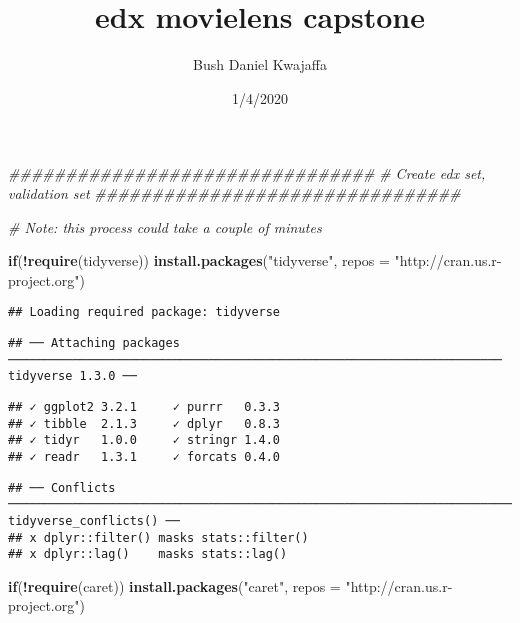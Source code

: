 \documentclass[]{article}
\title{edx movielens capstone}
\author{Bush Daniel Kwajaffa}
\date{1/4/2020}
\newenvironment{Shaded}{\begin{snugshade}}{\end{snugshade}}
\newcommand{\CommentTok}[1]{\textcolor[rgb]{0.56,0.35,0.01}{\textit{#1}}}
\newcommand{\ControlFlowTok}[1]{\textcolor[rgb]{0.13,0.29,0.53}{\textbf{#1}}}
\newcommand{\DataTypeTok}[1]{\textcolor[rgb]{0.13,0.29,0.53}{#1}}
\newcommand{\KeywordTok}[1]{\textcolor[rgb]{0.13,0.29,0.53}{\textbf{#1}}}
\newcommand{\NormalTok}[1]{#1}
\newcommand{\OperatorTok}[1]{\textcolor[rgb]{0.81,0.36,0.00}{\textbf{#1}}}
\newcommand{\StringTok}[1]{\textcolor[rgb]{0.31,0.60,0.02}{#1}}
\begin{document}
\maketitle

\begin{Shaded}
\begin{Highlighting}[]
\CommentTok{################################}
\CommentTok{# Create edx set, validation set}
\CommentTok{################################}

\CommentTok{# Note: this process could take a couple of minutes}

\ControlFlowTok{if}\NormalTok{(}\OperatorTok{!}\KeywordTok{require}\NormalTok{(tidyverse)) }\KeywordTok{install.packages}\NormalTok{(}\StringTok{"tidyverse"}\NormalTok{, }\DataTypeTok{repos =} \StringTok{"http://cran.us.r-project.org"}\NormalTok{)}
\end{Highlighting}
\end{Shaded}

\begin{verbatim}
## Loading required package: tidyverse
\end{verbatim}

\begin{verbatim}
## ── Attaching packages ───────────────────────────────────────────────────────────────────── tidyverse 1.3.0 ──
\end{verbatim}

\begin{verbatim}
## ✓ ggplot2 3.2.1     ✓ purrr   0.3.3
## ✓ tibble  2.1.3     ✓ dplyr   0.8.3
## ✓ tidyr   1.0.0     ✓ stringr 1.4.0
## ✓ readr   1.3.1     ✓ forcats 0.4.0
\end{verbatim}

\begin{verbatim}
## ── Conflicts ──────────────────────────────────────────────────────────────────────── tidyverse_conflicts() ──
## x dplyr::filter() masks stats::filter()
## x dplyr::lag()    masks stats::lag()
\end{verbatim}

\begin{Shaded}
\begin{Highlighting}[]
\ControlFlowTok{if}\NormalTok{(}\OperatorTok{!}\KeywordTok{require}\NormalTok{(caret)) }\KeywordTok{install.packages}\NormalTok{(}\StringTok{"caret"}\NormalTok{, }\DataTypeTok{repos =} \StringTok{"http://cran.us.r-project.org"}\NormalTok{)}
\end{Highlighting}
\end{Shaded}
\end{document}
